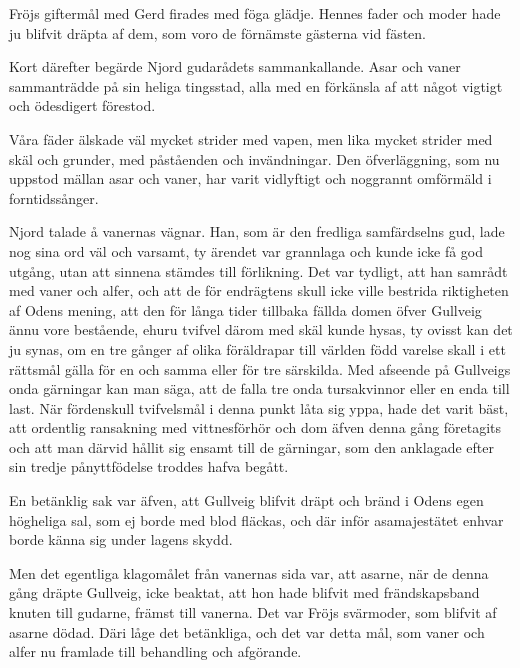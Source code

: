 Fröjs giftermål med Gerd firades med föga glädje. Hennes fader och moder
hade ju blifvit dräpta af dem, som voro de förnämste gästerna vid
fästen.

Kort därefter begärde Njord gudarådets sammankallande. Asar och vaner
sammanträdde på sin heliga tingsstad, alla med en förkänsla af att något
vigtigt och ödesdigert förestod.

Våra fäder älskade väl mycket strider med vapen, men lika mycket strider
med skäl och grunder, med påståenden och invändningar. Den
öfverläggning, som nu uppstod mällan asar och vaner, har varit
vidlyftigt och noggrannt omförmäld i forntidssånger.

Njord talade å vanernas vägnar. Han, som är den fredliga samfärdselns
gud, lade nog sina ord väl och varsamt, ty ärendet var grannlaga och
kunde icke få god utgång, utan att sinnena stämdes till förlikning. Det
var tydligt, att han samrådt med vaner och alfer, och att de för
endrägtens skull icke ville bestrida riktigheten af Odens mening, att
den för långa tider tillbaka fällda domen öfver Gullveig ännu vore
bestående, ehuru tvifvel därom med skäl kunde hysas, ty ovisst kan det
ju synas, om en tre gånger af olika föräldrapar till världen född
varelse skall i ett rättsmål gälla för en och samma eller för tre
särskilda. Med afseende på Gullveigs onda gärningar kan man säga, att de
falla tre onda tursakvinnor eller en enda till last. När fördenskull
tvifvelsmål i denna punkt låta sig yppa, hade det varit bäst, att
ordentlig ransakning med vittnesförhör och dom äfven denna gång
företagits\protect\hypertarget{lb1625905.xhtmlux5cux23start141}{}{}\protect\hypertarget{lb1625905.xhtmlux5cux23start141-a}{}{}\protect\hypertarget{lb1625905.xhtmlux5cux23start141-b}{}{}\protect\hypertarget{lb1625905.xhtmlux5cux23start141-c}{}{}\protect\hypertarget{lb1625905.xhtmlux5cux23start141-d}{}{}
och att man därvid hållit sig ensamt till de gärningar, som den
anklagade efter sin tredje pånyttfödelse troddes hafva begått.

En betänklig sak var äfven, att Gullveig blifvit dräpt och bränd i Odens
egen högheliga sal, som ej borde med blod fläckas, och där inför
asamajestätet enhvar borde känna sig under lagens skydd.

Men det egentliga klagomålet från vanernas sida var, att asarne, när de
denna gång dräpte Gullveig, icke beaktat, att hon hade blifvit med
frändskapsband knuten till gudarne, främst till vanerna. Det var Fröjs
svärmoder, som blifvit af asarne dödad. Däri låge det betänkliga, och
det var detta mål, som vaner och alfer nu framlade till behandling och
afgörande.

